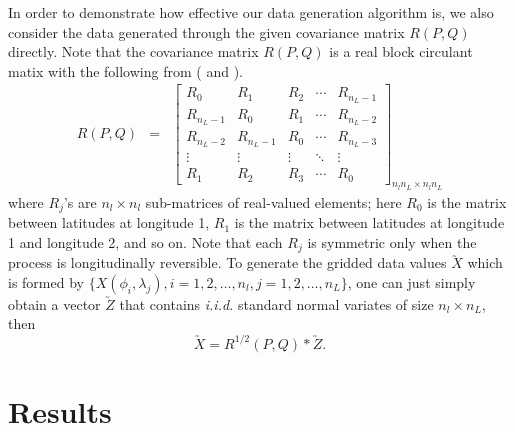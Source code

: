 In order to demonstrate how effective our data generation algorithm is, we also consider the data generated through the given covariance matrix $R(P, Q)$ directly. Note that the covariance matrix $R(P, Q)$ is a real block circulant matix with the following from (\cite{Li2013} and \cite{JunStein2008}). 
 \begin{eqnarray}
	R(P,Q) &=& \left[
		\begin{array}{lllll}
			R_0     & R_1     & R_2    & \cdots & R_{n_L-1} \\
			R_{n_L-1} & R_0     & R_1    & \cdots & R_{n_L-2} \\
			R_{n_L-2} & R_{n_L-1} & R_0    & \cdots & R_{n_L-3} \\
			\vdots  & \vdots  & \vdots & \ddots & \vdots  \\
			R_1     & R_2     & R_3    & \cdots & R_0
		\end{array}
	\right]_{n_ln_L\times n_ln_L}
\end{eqnarray}
where $R_j$'s are $n_l\times n_l$ sub-matrices of real-valued elements; here $R_0$ is the \cov matrix between latitudes at longitude 1, $R_1$ is the \cov matrix between latitudes at longitude 1 and longitude 2, and so on. Note that each $R_j$ is symmetric only when the process is longitudinally reversible. To generate the gridded data values $\utilde{X}$ which is formed by $\{X(\phi_i, \lambda_j), i = 1, 2, \ldots, n_l, j = 1, 2, \ldots, n_L\}$, one can just simply obtain a vector $\utilde{Z}$ that contains {\em i.i.d.} standard normal variates of size $n_l \times n_L$, then
\[
\utilde{X} = R^{1/2}(P, Q)*\utilde{Z}.
\] 

\section{Results}
	


